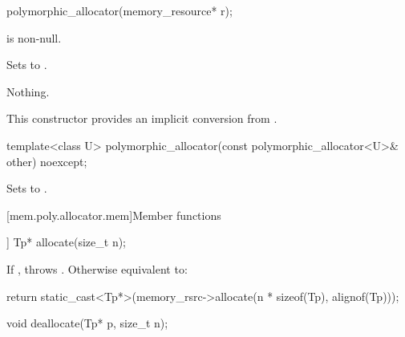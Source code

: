 %
\begin{itemdecl}
polymorphic_allocator(memory_resource* r);
\end{itemdecl}

\begin{itemdescr}
\pnum
\expects
{} is non-null.

\pnum
\effects
Sets  to .

\pnum
\throws
Nothing.

\pnum
\begin{note}
This constructor provides an implicit conversion from .
\end{note}
\end{itemdescr}

%
\begin{itemdecl}
template<class U> polymorphic_allocator(const polymorphic_allocator<U>& other) noexcept;
\end{itemdecl}

\begin{itemdescr}
\pnum
\effects
Sets  to .
\end{itemdescr}


[mem.poly.allocator.mem]{Member functions}

\begin{indexed}{}
\begin{itemdecl}
[[nodiscard]] Tp* allocate(size_t n);
\end{itemdecl}
\end{indexed}

\begin{itemdescr}
\pnum
\effects
If ,
throws .
Otherwise equivalent to:
\begin{codeblock}
return static_cast<Tp*>(memory_rsrc->allocate(n * sizeof(Tp), alignof(Tp)));
\end{codeblock}
\end{itemdescr}

\begin{indexed}{}
\begin{itemdecl}
void deallocate(Tp* p, size_t n);
\end{itemdecl}
\end{indexed}

